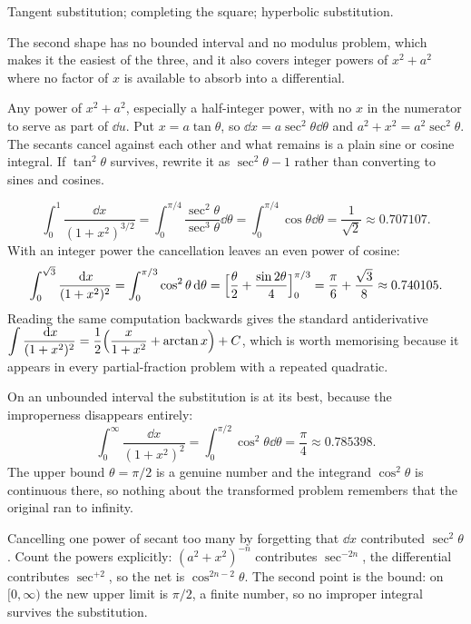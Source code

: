 \begin{seealsob}Tangent substitution; completing the square; hyperbolic substitution.\end{seealsob}

The second shape has no bounded interval and no modulus problem, which makes it the easiest of the three, and it also covers integer powers of $x^2+a^2$ where no factor of $x$ is available to absorb into a differential.

\cue Any power of $x^2+a^2$, especially a half-integer power, with no $x$ in the numerator to serve as part of $\dd u$.
\method Put $x=a\tan\theta$, so $\dd x=a\sec^2\theta\dd\theta$ and $a^2+x^2=a^2\sec^2\theta$. The secants cancel against each other and what remains is a plain sine or cosine integral. If $\tan^2\theta$ survives, rewrite it as $\sec^2\theta-1$ rather than converting to sines and cosines.

\begin{worked}
\[
\int_0^1\frac{\dd x}{(1+x^2)^{3/2}}=\int_0^{\pi/4}\frac{\sec^2\theta}{\sec^3\theta}\dd\theta=\int_0^{\pi/4}\cos\theta\dd\theta=\frac{1}{\sqrt2}\approx0.707107 .
\]
With an integer power the cancellation leaves an even power of cosine:
\[
\int_0^{\sqrt3}\frac{\,\mathrm{d} x}{(1+x^2)^2}=\int_0^{\pi/3}\cos^2\theta\,\mathrm{d}\theta=\Bigl[\frac{\theta}{2}+\frac{\sin2\theta}{4}\Bigr]_0^{\pi/3}=\frac{\pi}{6}+\frac{\sqrt3}{8}\approx0.740105 .
\]
Reading the same computation backwards gives the standard antiderivative $\displaystyle\int\frac{\,\mathrm{d} x}{(1+x^2)^2}=\frac12\Bigl(\frac{x}{1+x^2}+\arctan x\Bigr)+C$, which is worth memorising because it appears in every partial-fraction problem with a repeated quadratic.

On an unbounded interval the substitution is at its best, because the improperness disappears entirely:
\[
\int_0^{\infty}\frac{\dd x}{(1+x^2)^2}=\int_0^{\pi/2}\cos^2\theta\dd\theta=\frac{\pi}{4}\approx0.785398 .
\]
The upper bound $\theta=\pi/2$ is a genuine number and the integrand $\cos^2\theta$ is continuous there, so nothing about the transformed problem remembers that the original ran to infinity.
\end{worked}

\begin{trap}
Cancelling one power of secant too many by forgetting that $\dd x$ contributed $\sec^2\theta$. Count the powers explicitly: $(a^2+x^2)^{-n}$ contributes $\sec^{-2n}$, the differential contributes $\sec^{+2}$, so the net is $\cos^{2n-2}\theta$. The second point is the bound: on $[0,\infty)$ the new upper limit is $\pi/2$, a finite number, so no improper integral survives the substitution.
\end{trap}

